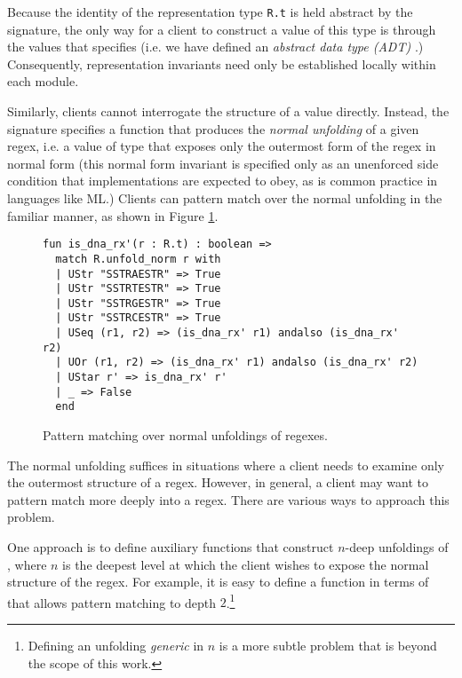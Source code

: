 Because the identity of the representation type \lstinline{R.t} is held abstract by the signature, the only way for a client to construct a value of this type is through the values that  specifies (i.e. we have defined an \emph{abstract data type (ADT)}  \cite{liskov1974programming}.) Consequently, representation invariants need only be established locally within each module.




Similarly, clients cannot interrogate the structure of a value  directly. Instead, the signature specifies a function  that produces the \emph{normal unfolding} of a given regex, i.e. a value of type  that exposes only the outermost form of the regex in normal form (this normal form invariant is specified only as an unenforced side condition that implementations are expected to obey, as is common practice in languages like ML.) Clients can pattern match over the {normal unfolding} in the familiar manner, as shown in Figure \ref{fig:is_dna_rx_prime}. 
\begin{figure}
\begin{lstlisting}[numbers=none]
fun is_dna_rx'(r : R.t) : boolean => 
  match R.unfold_norm r with 
  | UStr "SSTRAESTR" => True
  | UStr "SSTRTESTR" => True
  | UStr "SSTRGESTR" => True
  | UStr "SSTRCESTR" => True
  | USeq (r1, r2) => (is_dna_rx' r1) andalso (is_dna_rx' r2)
  | UOr (r1, r2) => (is_dna_rx' r1) andalso (is_dna_rx' r2)
  | UStar r' => is_dna_rx' r'
  | _ => False
  end
\end{lstlisting}
\vspace{-5px}
\caption{Pattern matching over normal unfoldings of regexes.}
\label{fig:is_dna_rx_prime}
\end{figure}

The normal unfolding suffices in situations where a client needs to examine only the outermost structure of a regex. However, in general, a client may want to pattern match more deeply into a regex. There are various ways to approach this problem. 

One approach is to define auxiliary functions that construct $n$-deep unfoldings of , where $n$ is the deepest level at which the client wishes to expose the normal structure of the regex. For example, it is easy to define a function  in terms of  that allows pattern matching to depth $2$.\footnote{Defining an unfolding \emph{generic} in $n$ is a more subtle problem that is beyond the scope of this work.} 

